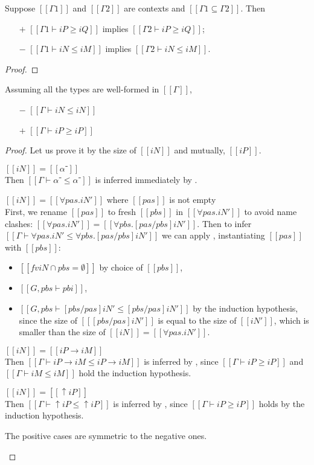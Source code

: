\begin{lemma}
  \label{lemma:subt-weakening}
  Suppose $[[Γ1]]$ and $[[Γ2]]$ are contexts 
  and $[[ Γ1 ⊆ Γ2 ]]$.
  Then 
  \begin{enumerate}
    \item [$+$] $[[Γ1 ⊢ iP ≥ iQ]]$ implies $[[Γ2 ⊢ iP ≥ iQ]]$;
    \item [$-$] $[[Γ1 ⊢ iN ≤ iM]]$ implies $[[Γ2 ⊢ iN ≤ iM]]$.
  \end{enumerate}
\end{lemma}
\begin{proof}
\end{proof}


\begin{lemma} \label{lemma:subtyping-reflexivity}
  Assuming all the types are well-formed in $[[Γ]]$,
  \begin{itemize}
    \item [$-$] $[[Γ ⊢ iN ≤ iN]]$
    \item [$+$] $[[Γ ⊢ iP ≥ iP]]$
  \end{itemize}
\end{lemma}
\begin{proof}
  Let us prove it by the size of $[[iN]]$ and mutually, $[[iP]]$.
  \begin{caseof}
    \item $[[iN]] = [[α⁻]]$\\
      Then $[[Γ ⊢ α⁻ ≤ α⁻]]$ is inferred immediately by .
    \item $[[iN]] = [[∀pas.iN']]$ where $[[pas]]$ is not empty\\
      First, we rename $[[pas]]$ to fresh $[[pbs]]$ in $[[∀pas.iN']]$ to avoid
      name clashes: $[[∀pas.iN']] = [[∀pbs.[pas/pbs]iN']]$.
      Then to infer $[[Γ ⊢ ∀pas.iN' ≤ ∀pbs.[pas/pbs]iN']]$ we can apply 
      , instantiating $[[pas]]$ with $[[pbs]]$:
      \begin{itemize}
        \item $[[fv iN ∩ {pbs} = ∅ ]]$ by choice of $[[pbs]]$,
        \item $[[G, pbs ⊢ pbi]]$,
        \item $[[G, pbs ⊢ [pbs/pas] iN' ≤ [pbs/pas] iN']]$ by the induction hypothesis,
        since the size of $[[ [pbs/pas]iN' ]]$ is equal to the size of $[[iN']]$,
        which is smaller than the size of $[[iN]] = [[∀pas.iN']]$.
      \end{itemize}
    \item $[[iN]] = [[iP → iM]]$\\
      Then $[[Γ ⊢ iP → iM ≤ iP → iM]]$ is inferred by ,
      since $[[Γ ⊢ iP ≥ iP]]$ and $[[Γ ⊢ iM ≤ iM]]$ hold the induction hypothesis. 
    \item $[[iN]] = [[↑iP]]$\\
      Then $[[Γ ⊢ ↑iP ≤ ↑iP]]$ is inferred by ,
      since $[[Γ ⊢ iP ≥ iP]]$ holds by the induction hypothesis.
    \item The positive cases are symmetric to the negative ones.
  \end{caseof}
\end{proof}

